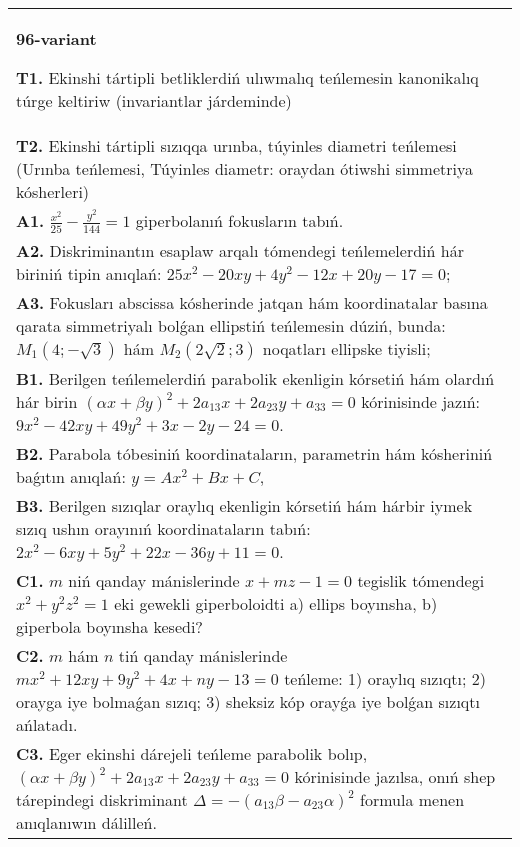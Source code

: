 \documentclass{article}
\begin{document}
\begin{tabular}{m{17cm}}
\textbf{96-variant}
\newline

\textbf{T1.} Ekinshi tártipli betliklerdiń ulıwmalıq teńlemesin kanonikalıq túrge keltiriw (invariantlar járdeminde) \\
\textbf{T2.} Ekinshi tártipli sızıqqa urınba, túyinles diametri teńlemesi (Urınba teńlemesi, Túyinles diametr: oraydan ótiwshi simmetriya kósherleri) \\
\textbf{A1.} $\frac{x^2}{25}-\frac{y^2}{144}=1$ giperbolanıń fokusların tabıń. \\
\textbf{A2.} Diskriminantın esaplaw arqalı tómendegi teńlemelerdiń hár biriniń tipin anıqlań: $25 x^2-20 x y+4 y^2-12 x+20 y-17=0$; \\
\textbf{A3.} Fokusları abscissa kósherinde jatqan hám koordinatalar basına qarata simmetriyalı bolǵan ellipstiń teńlemesin dúziń, bunda: $M_1 (4;-\sqrt{3}) $ hám $M_2 (2 \sqrt{2}; 3)$ noqatları ellipske tiyisli; \\
\textbf{B1.} Berilgen teńlemelerdiń parabolik ekenligin kórsetiń hám olardıń hár birin $(\alpha x+\beta y)^2+2 a_{13} x+2 a_{23} y+a_{33}=0$ kórinisinde jazıń:  $9 x^2-42 x y+49 y^2+3 x-2 y-24=0$. \\
\textbf{B2.} Parabola tóbesiniń koordinataların, parametrin hám kósheriniń baǵıtın anıqlań: $y=A x^2+B x+C$, \\
\textbf{B3.} Berilgen sızıqlar oraylıq ekenligin kórsetiń hám hárbir iymek sızıq ushın orayınıń koordinataların tabıń: $2 x^2-6 x y+5 y^2+22 x-36 y+11=0$. \\
\textbf{C1.} $m$ niń qanday mánislerinde $x+mz-1=0$ tegislik tómendegi $x^2+y^2z^2=1$ eki gewekli giperboloidti a) ellips boyınsha, b) giperbola boyınsha kesedi? \\
\textbf{C2.} $m$ hám $n$ tiń qanday mánislerinde $m x^2+12 x y+9 y^2+4 x+n y-13=0$ teńleme: 1) oraylıq sızıqtı; 2) orayga iye bolmaǵan sızıq; 3) sheksiz kóp orayǵa iye bolǵan sızıqtı ańlatadı. \\
\textbf{C3.} Eger ekinshi dárejeli teńleme parabolik bolıp, $ (\alpha x+\beta y) ^2+2a_{13}x+2a_{23}y+a_{33}=0$ kórinisinde jazılsa, onıń shep tárepindegi diskriminant $\Delta=- (a_{13} \beta-a_{23} \alpha) ^2$ formula menen anıqlanıwın dálilleń. \\

\end{tabular}
\vspace{1cm}
\end{document}
